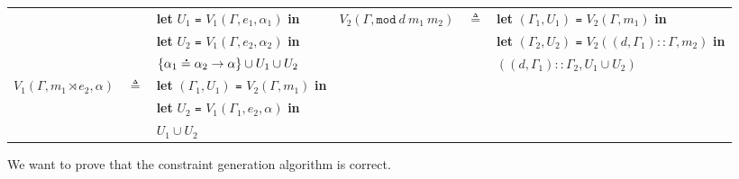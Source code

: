 \documentclass{article}
\theoremstyle{definition}
\newcommand*{\cons}{::}
\newcommand*{\A}[1]{\overset{\,_{\mbox{\Large .}}}{#1}}
\newcommand*{\modid}{d}
\newcommand*{\link}[2]{{#1}\rtimes{#2}}
\newcommand*{\Letm}{\mathtt{mod}}
\begin{document}
\begin{tabular}{rclrcl}
	                                     &              & \textbf{let} $U_1$ \texttt{=} $V_1(\Gamma,e_1,\alpha_1)$ \textbf{in}              & $V_2(\Gamma,\Letm\:\modid\:m_1\:m_2)$ & $\triangleq$ & \textbf{let} $(\Gamma_1,U_1)$ \texttt{=} $V_2(\Gamma,m_1)$ \textbf{in}                       \\
	                                     &              & \textbf{let} $U_2$ \texttt{=} $V_1(\Gamma,e_2,\alpha_2)$ \textbf{in}              &                                       &              & \textbf{let} $(\Gamma_2,U_2)$ \texttt{=} $V_2((\modid,\Gamma_1)\cons\Gamma,m_2)$ \textbf{in} \\
	                                     &              & $\{\alpha_1\A{=}\alpha_2\rightarrow\alpha\}\cup U_1\cup U_2$                      &                                       &              & $((\modid,\Gamma_1)\cons\Gamma_2,U_1\cup U_2)$                                               \\
	$V_1(\Gamma,\link{m_1}{e_2},\alpha)$ & $\triangleq$ & \textbf{let} $(\Gamma_1,U_1)$ \texttt{=} $V_2(\Gamma,m_1)$ \textbf{in}                                                                                                                                                                  \\
	                                     &              & \textbf{let} $U_2$ \texttt{=} $V_1(\Gamma_1,e_2,\alpha)$ \textbf{in}                                                                                                                                                                    \\
	                                     &              & $U_1\cup U_2$                                                                                                                                                                                                                           \\
\end{tabular}

\vphantom{}

We want to prove that the constraint generation algorithm is correct.
\end{document}
